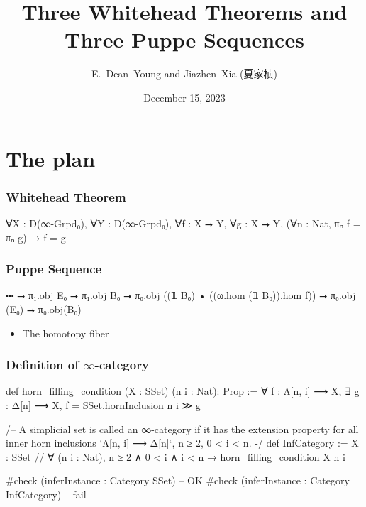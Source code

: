 \documentclass{beamer}
\title{Three Whitehead Theorems and Three Puppe Sequences}
\author{E.~Dean~Young and Jiazhen~Xia (夏家桢)}
\date{December 15, 2023}
\begin{document}
\begin{frame}
\titlepage
\end{frame}


\section{The plan}

\begin{frame}[fragile]
\frametitle{Whitehead Theorem}
\begin{leancode}
∀X : D(∞-Grpd₀), ∀Y : D(∞-Grpd₀),
∀f : X ⭢ Y, ∀g : X ⭢ Y,
(∀n : Nat, πₙ f = πₙ g) → f = g
\end{leancode}
\end{frame}

\begin{frame}[fragile]
\frametitle{Puppe Sequence}
\begin{leancode}
⬝⬝⬝ ⭢ π₁.obj E₀ ⭢ π₁.obj B₀ ⭢
π₀.obj ((𝟙 B₀) • ((ω.hom (𝟙 B₀)).hom f)) ⭢
π₀.obj (E₀) ⭢ π₀.obj(B₀)
\end{leancode}
\medskip
\begin{itemize}
	\item The homotopy fiber
\end{itemize}
\end{frame}


\begin{frame}[fragile] %
\frametitle{Definition of $\infty$-category}
  \begin{leancode}
  def horn_filling_condition (X : SSet) (n i : Nat): Prop :=
    ∀ f : Λ[n, i] ⟶ X, ∃ g : Δ[n] ⟶ X,
    f = SSet.hornInclusion n i ≫ g
  
  /-- A simplicial set is called an ∞-category
  if it has the extension property for all inner horn inclusions
  `Λ[n, i] ⟶ Δ[n]`, n ≥ 2, 0 < i < n. -/
  def InfCategory := {X : SSet //
    ∀ (n i : Nat),
    n ≥ 2 ∧ 0 < i ∧ i < n → horn_filling_condition X n i}
    
  #check (inferInstance : Category SSet) -- OK
  #check (inferInstance : Category InfCategory) -- fail
  \end{leancode}
\end{frame}
\end{document}
